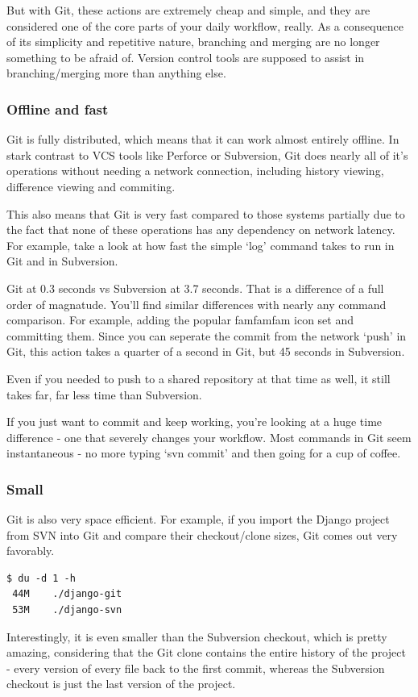 But with Git, these actions are extremely cheap and simple, and they are
considered one of the core parts of your daily workflow, really. As a consequence
of its simplicity and repetitive nature, branching and merging are no longer
something to be afraid of. Version control tools are supposed to assist in
branching/merging more than anything else.

\subsubsection{Offline and fast}
Git is fully distributed, which means that it can work almost entirely offline.
In stark contrast to VCS tools like Perforce or Subversion, Git does nearly all
of it’s operations without needing a network connection, including history
viewing, difference viewing and commiting.

This also means that Git is very fast compared to those systems partially due to
the fact that none of these operations has any dependency on network latency. For
example, take a look at how fast the simple ‘log’ command takes to run in Git and
in Subversion.

Git at 0.3 seconds vs Subversion at 3.7 seconds. That is a difference of a full
order of magnatude. You’ll find similar differences with nearly any command
comparison. For example, adding the popular famfamfam icon set and committing
them. Since you can seperate the commit from the network ‘push’ in Git, this
action takes a quarter of a second in Git, but 45 seconds in Subversion.

Even if you needed to push to a shared repository at that time as well, it still
takes far, far less time than Subversion.

If you just want to commit and keep working, you’re looking at a huge time
difference - one that severely changes your workflow. Most commands in Git seem
instantaneous - no more typing ‘svn commit’ and then going for a cup of coffee.

\subsubsection{Small}
Git is also very space efficient. For example, if you import the Django project
from SVN into Git and compare their checkout/clone sizes, Git comes out very
favorably.
\begin{verbatim}
$ du -d 1 -h
 44M	./django-git
 53M	./django-svn
\end{verbatim}
Interestingly, it is even smaller than the Subversion checkout, which is pretty
amazing, considering that the Git clone contains the entire history of the
project - every version of every file back to the first commit, whereas the
Subversion checkout is just the last version of the project.


